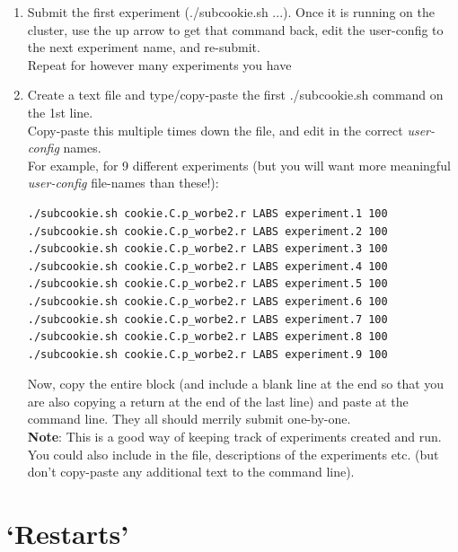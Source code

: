 \begin{enumerate}[noitemsep]
\vspace{1mm}
\item Submit the first experiment (\textsf{\footnotesize ./subcookie.sh} ...). Once it is running on the cluster, use the up arrow to get that command back, edit the user-config to the next experiment name, and re-submit. 
\\Repeat for however many experiments you have
\vspace{1mm}
\item Create a text file and type/copy-paste the first \textsf{\footnotesize ./subcookie.sh} command on the 1st line.
\\Copy-paste this multiple times down the file, and edit in the correct \textit{user-config} names.
\\For example, for 9 different experiments (but you will want more meaningful \textit{user-config} file-names than these!):

\vspace{-0mm}\footnotesize\begin{verbatim}
./subcookie.sh cookie.C.p_worbe2.r LABS experiment.1 100
./subcookie.sh cookie.C.p_worbe2.r LABS experiment.2 100
./subcookie.sh cookie.C.p_worbe2.r LABS experiment.3 100
./subcookie.sh cookie.C.p_worbe2.r LABS experiment.4 100
./subcookie.sh cookie.C.p_worbe2.r LABS experiment.5 100
./subcookie.sh cookie.C.p_worbe2.r LABS experiment.6 100
./subcookie.sh cookie.C.p_worbe2.r LABS experiment.7 100
./subcookie.sh cookie.C.p_worbe2.r LABS experiment.8 100
./subcookie.sh cookie.C.p_worbe2.r LABS experiment.9 100

\end{verbatim}\normalsize\vspace{-2mm}
Now, copy the entire block (and include a blank line at the end so that you are also copying a return at the end of the last line) and paste at the command line. They all should merrily submit one-by-one.
\\\textbf{Note}: This is a good way of keeping track of experiments created and run. You could also include in the file, descriptions of the experiments etc. (but don't copy-paste any additional text to the command line).
\end{enumerate}

\newpage

\section{‘Restarts’}


